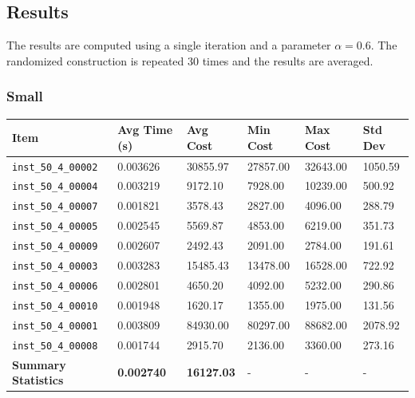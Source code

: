 \documentclass{article}
\begin{document}
\subsection*{Results}
The results are computed using a single iteration and a parameter $\alpha = 0.6$. The randomized construction is repeated 30 times and the results are averaged.

\subsubsection*{Small}


\begin{table}[H]
\centering
\hspace*{-1.5cm}
\begin{tabular}{llllll}
\toprule
\textbf{Item} & \textbf{Avg Time (s)} & \textbf{Avg Cost} & \textbf{Min Cost} & \textbf{Max Cost} & \textbf{Std Dev} \\
\midrule
\texttt{inst\_50\_4\_00002} & 0.003626 & 30855.97 & 27857.00 & 32643.00 & 1050.59 \\
\texttt{inst\_50\_4\_00004} & 0.003219 & 9172.10  & 7928.00  & 10239.00 & 500.92  \\
\texttt{inst\_50\_4\_00007} & 0.001821 & 3578.43  & 2827.00  & 4096.00  & 288.79  \\
\texttt{inst\_50\_4\_00005} & 0.002545 & 5569.87  & 4853.00  & 6219.00  & 351.73  \\
\texttt{inst\_50\_4\_00009} & 0.002607 & 2492.43  & 2091.00  & 2784.00  & 191.61  \\
\texttt{inst\_50\_4\_00003} & 0.003283 & 15485.43 & 13478.00 & 16528.00 & 722.92  \\
\texttt{inst\_50\_4\_00006} & 0.002801 & 4650.20  & 4092.00  & 5232.00  & 290.86  \\
\texttt{inst\_50\_4\_00010} & 0.001948 & 1620.17  & 1355.00  & 1975.00  & 131.56  \\
\texttt{inst\_50\_4\_00001} & 0.003809 & 84930.00 & 80297.00 & 88682.00 & 2078.92 \\
\texttt{inst\_50\_4\_00008} & 0.001744 & 2915.70  & 2136.00  & 3360.00  & 273.16  \\
\midrule
\textbf{Summary Statistics} & \textbf{0.002740} & \textbf{16127.03} & - & - & - \\
\bottomrule
\end{tabular}
\label{tab:performance_metrics_randomized}
\end{table}
\end{document}
